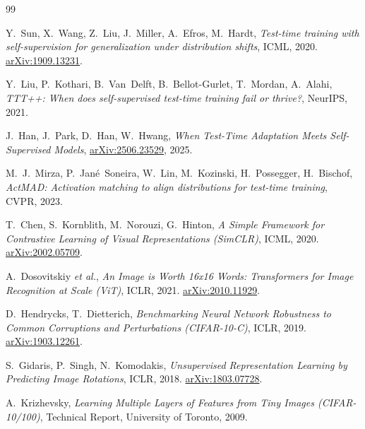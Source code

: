 \documentclass[12pt,a4paper]{report}
\begin{document}
	\begin{thebibliography}{99}
		
		Y.~Sun, X.~Wang, Z.~Liu, J.~Miller, A.~Efros, M.~Hardt,
		\emph{Test-time training with self-supervision for generalization under distribution shifts},
		ICML, 2020. \href{https://arxiv.org/abs/1909.13231}{arXiv:1909.13231}.
		
		Y.~Liu, P.~Kothari, B.~Van~Delft, B.~Bellot-Gurlet, T.~Mordan, A.~Alahi,
		\emph{TTT++: When does self-supervised test-time training fail or thrive?},
		NeurIPS, 2021.
		
		J.~Han, J.~Park, D.~Han, W.~Hwang,
		\emph{When Test-Time Adaptation Meets Self-Supervised Models},
		\href{https://arxiv.org/abs/2506.23529}{arXiv:2506.23529}, 2025.
		
		M.~J.~Mirza, P.~Jan\'e~Soneira, W.~Lin, M.~Kozinski, H.~Possegger, H.~Bischof,
		\emph{ActMAD: Activation matching to align distributions for test-time training},
		CVPR, 2023.
		
		T.~Chen, S.~Kornblith, M.~Norouzi, G.~Hinton,
		\emph{A Simple Framework for Contrastive Learning of Visual Representations (SimCLR)},
		ICML, 2020. \href{https://arxiv.org/abs/2002.05709}{arXiv:2002.05709}.
		
		A.~Dosovitskiy \emph{et al.},
		\emph{An Image is Worth 16x16 Words: Transformers for Image Recognition at Scale (ViT)},
		ICLR, 2021. \href{https://arxiv.org/abs/2010.11929}{arXiv:2010.11929}.
		
		D.~Hendrycks, T.~Dietterich,
		\emph{Benchmarking Neural Network Robustness to Common Corruptions and Perturbations (CIFAR-10-C)},
		ICLR, 2019. \href{https://arxiv.org/abs/1903.12261}{arXiv:1903.12261}.
		
		S.~Gidaris, P.~Singh, N.~Komodakis,
		\emph{Unsupervised Representation Learning by Predicting Image Rotations},
		ICLR, 2018. \href{https://arxiv.org/abs/1803.07728}{arXiv:1803.07728}.
		
		A.~Krizhevsky,
		\emph{Learning Multiple Layers of Features from Tiny Images (CIFAR-10/100)},
		Technical Report, University of Toronto, 2009.
		
	\end{thebibliography}
	
\end{document}
